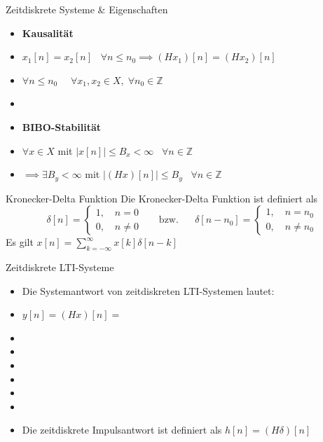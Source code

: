 \documentclass[14pt, aspectratio=169, handout]{beamer}
\begin{document}
\begin{frame}{Zeitdiskrete Systeme \& Eigenschaften}
    \begin{itemize}
        \item \textbf{Kausalität}
        \item[] $x_1[n] = x_2[n] \hspace{10pt} \forall n \leq n_0 \implies (Hx_1)[n] = (Hx_2)[n] \hspace{10pt} $
        \item[] $\forall n \leq n_0 \hspace{16pt} \forall x_1, x_2 \in X, \; \forall n_0 \in \mathbb{Z}$
        \item[] 
        \item \textbf{BIBO-Stabilität}
        \item[] $\forall x \in X$ mit $|x[n]| \leq B_x < \infty \hspace{10pt} \forall n \in \mathbb{Z} $
        \item[] $\implies \exists B_y < \infty$ mit $ |(Hx)[n]| \leq B_y \hspace{10pt} \forall n \in \mathbb{Z}$
    \end{itemize}
\end{frame}

\begin{frame}{Kronecker-Delta Funktion}
    Die Kronecker-Delta Funktion ist definiert als
$$\delta[n] = \begin{cases}
    1, \hspace{12pt} n = 0 \\
    0, \hspace{12pt} n \neq 0
\end{cases} \hspace{20pt} \text{bzw.} \hspace{20pt} \delta[n-n_0] = \begin{cases}
    1, \hspace{12pt} n = n_0 \\
    0, \hspace{12pt} n \neq n_0
\end{cases}$$
Es gilt $x[n] = \displaystyle\sum_{k=-\infty}^\infty x[k]\delta[n-k]$
\end{frame}

\begin{frame}{Zeitdiskrete LTI-Systeme}
    \begin{itemize}
        \item Die Systemantwort von zeitdiskreten LTI-Systemen lautet:
        \item[] $y[n] = (Hx)[n] =$
        \item[]
        \item[] 
        \item[]
        \item[] 
        \item[]
        \item[] 
        \item Die zeitdiskrete Impulsantwort ist definiert als $h[n] = (H\delta)[n]$
    \end{itemize}
\end{frame}
\end{document}
